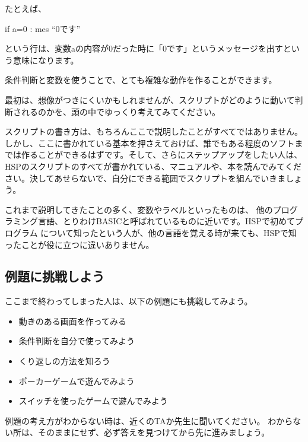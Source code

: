 たとえば、

\begin{description}
    \item if a=0 : mes “0です”
\end{description}

という行は、変数aの内容が0だった時に「0です」というメッセージを出すという意味になります。

条件判断と変数を使うことで、とても複雑な動作を作ることができます。

最初は、想像がつきにくいかもしれませんが、スクリプトがどのように動いて判断されるのかを、頭の中でゆっくり考えてみてください。

スクリプトの書き方は、もちろんここで説明したことがすべてではありません。しかし、ここに書かれている基本を押さえておけば、誰でもある程度のソフトまでは作ることができるはずです。そして、さらにステップアップをしたい人は、HSPのスクリプトのすべてが書かれている、マニュアルや、本を読んでみてください。決してあせらないで、自分にできる範囲でスクリプトを組んでいきましょう。

これまで説明してきたことの多く、変数やラベルといったものは、
他のプログラミング言語、とりわけBASICと呼ばれているものに近いです。HSPで初めてプログラム
について知ったという人が、他の言語を覚える時が来ても、HSPで知ったことが役に立つに違いありません。

\subsection{例題に挑戦しよう}

ここまで終わってしまった人は、以下の例題にも挑戦してみよう。

\begin{itemize}
    \item 動きのある画面を作ってみる
    \item 条件判断を自分で使ってみよう
    \item くり返しの方法を知ろう
    \item ポーカーゲームで遊んでみよう
    \item スイッチを使ったゲームで遊んでみよう
\end{itemize}

例題の考え方がわからない時は、近くのTAか先生に聞いてください。
わからない所は、そのままにせず、必ず答えを見つけてから先に進みましょう。

